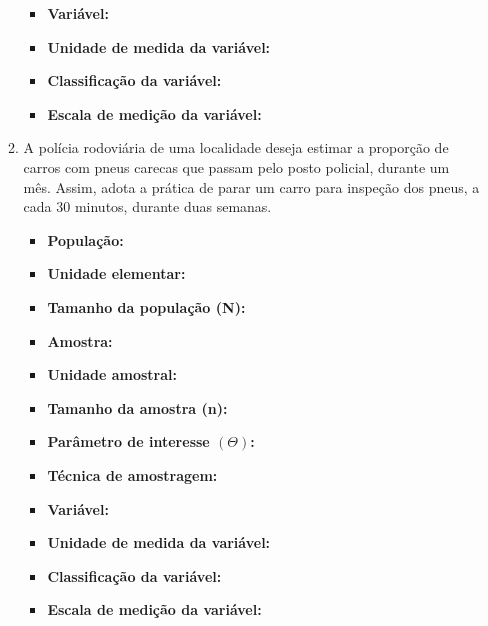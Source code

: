 \begin{enumerate}[label=\emph{\arabic*})]
\begin{enumerate}[label=\emph{\alph*})]
\begin{itemize}
			            \item \textbf{Variável:}~

			            \item \textbf{Unidade de medida da variável:}~

			            \item \textbf{Classificação da variável:}~

			            \item \textbf{Escala de medição da variável:}~
		            \end{itemize}

		      \item A polícia rodoviária de uma localidade deseja estimar a proporção de carros com pneus
		            carecas que passam pelo posto policial, durante um mês. Assim, adota a prática de
		            parar um carro para inspeção dos pneus, a cada 30 minutos, durante duas semanas.

		            \begin{itemize}
			            \item \textbf{População:}~

			            \item \textbf{Unidade elementar:}~

			            \item \textbf{Tamanho da população (N):}~

			            \item \textbf{Amostra:}~

			            \item \textbf{Unidade amostral:}~

			            \item \textbf{Tamanho da amostra (n):}~

			            \item \textbf{Parâmetro de interesse $\left(\varTheta\right)$:}~

			            \item \textbf{Técnica de amostragem:}~

			            \item \textbf{Variável:}~

			            \item \textbf{Unidade de medida da variável:}~

			            \item \textbf{Classificação da variável:}~

			            \item \textbf{Escala de medição da variável:}~
		            \end{itemize}


\end{enumerate}
\end{enumerate}
